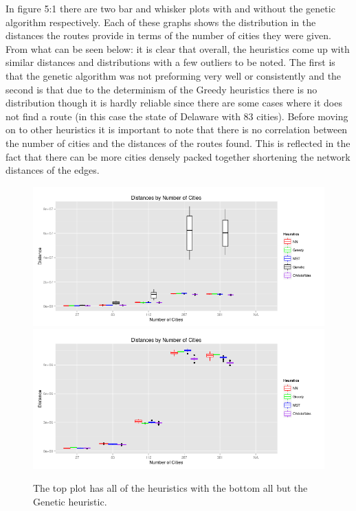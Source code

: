 \documentclass[midd]{thesis}
\newcommand{\tab}{\hspace*{2em}}
\begin{document}
\tab In figure 5:1 there are two bar and whisker plots with and without the genetic algorithm respectively. Each of these graphs shows the distribution in the distances the routes provide in terms  of the number of cities they were given.  From what can be seen below: it is clear that overall, the heuristics come up with similar distances and distributions with a few outliers to be noted. The first is that the genetic algorithm was not preforming very well or consistently and the second is that due to the determinism of the Greedy heuristics there is no distribution though it is hardly reliable since there are some cases where it does not find a route (in this case the state of Delaware with 83 cities). Before moving on to other heuristics it is important to note that there is no correlation between the number of cities and the distances of the routes found. This is reflected in the fact that there can be more cities densely packed together shortening the network distances of the edges.\\
\begin{figure}[t]
	\begin{center}
	\caption{The top plot has all of the heuristics with the bottom all but the Genetic heuristic.}
	\includegraphics[width=.95\textwidth]{box_w_gen}
	\includegraphics[width=.95\textwidth]{box_wo_gen}
	\end{center}
\end{figure}
\end{document}
